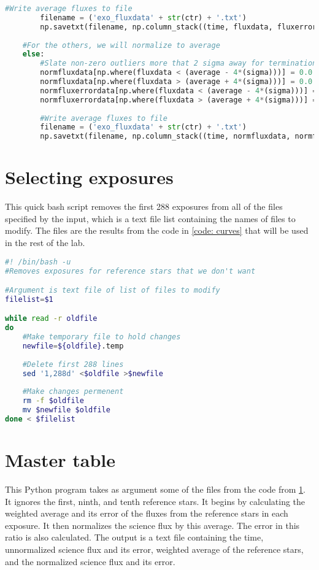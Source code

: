 \documentclass{aastex}
\begin{document}
\begin{lstlisting}[language = Python, caption = Plots the lightcurves for each star and outputs fluxes to files (YM and JM)]
		#Write average fluxes to file
		filename = ('exo_fluxdata' + str(ctr) + '.txt')
		np.savetxt(filename, np.column_stack((time, fluxdata, fluxerrordata)), fmt='%f')
		
	#For the others, we will normalize to average
	else:
		#Slate non-zero outliers more that 2 sigma away for termination
		normfluxdata[np.where(fluxdata < (average - 4*(sigma)))] = 0.0
		normfluxdata[np.where(fluxdata > (average + 4*(sigma)))] = 0.0
		normfluxerrordata[np.where(fluxdata < (average - 4*(sigma)))] = 0.0
		normfluxerrordata[np.where(fluxdata > (average + 4*(sigma)))] = 0.0
	
		#Write average fluxes to file
		filename = ('exo_fluxdata' + str(ctr) + '.txt')
		np.savetxt(filename, np.column_stack((time, normfluxdata, normfluxerrordata)), fmt='%f')
\end{lstlisting}

\appendix
\section{Selecting exposures} \label{code: select}
This quick bash script removes the first 288 exposures from all of the files specified by the input, which is a text file list containing the names of files to modify. The files are the results from the code in \ref{code: curves} that will be used in the rest of the lab.
\begin{lstlisting}[language = bash, caption = Removes first 288 exposures (YM)]
#! /bin/bash -u
#Removes exposures for reference stars that we don't want

#Argument is text file of list of files to modify
filelist=$1

while read -r oldfile
do
	#Make temporary file to hold changes
	newfile=${oldfile}.temp
	
	#Delete first 288 lines
	sed '1,288d' <$oldfile >$newfile
	
	#Make changes permenent
	rm -f $oldfile
	mv $newfile $oldfile
done < $filelist
\end{lstlisting}

\appendix
\section{Master table} \label{code: bigtable}
This Python program takes as argument some of the files from the code from \ref{code: select}. It ignores the first, ninth, and tenth reference stars. It begins by calculating the weighted average and its error of the fluxes from the reference stars in each exposure. It then normalizes the science flux by this average. The error in this ratio is also calculated. The output is a text file containing the time, unnormalized science flux and its error, weighted average of the reference stars, and the normalized science flux and its error. 
\end{document}
